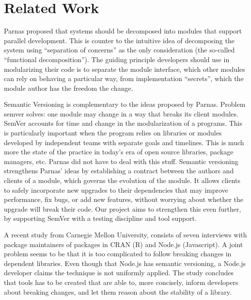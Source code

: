 \section{Related Work}

Parnas\cite{Parnas} proposed that systems should be decomposed into
modules that support parallel development. This is counter to the
intuitive idea of decomposing the system using ``separation of
concerns'' as the only consideration (the so-called ``functional
decomposition''). The guiding principle developers should use in
modularizing their code is to separate the module interface, which
other modules can rely on behaving a particular way, from
implementation ``secrets'', which the module author has the freedom
the change. 

%
Semantic Versioning\cite{semver} is complementary to the ideas
proposed by Parnas.
%
Problem semver solves: one module may change in a way that breaks its
client modules.
%
SemVer accounts for time and change in the modularization of a
programs. This is particularly important when the program relies on
libraries or modules developed by independent teams with separate
goals and timelines. This is much more the state of the practice in
today's era of open source libraries, package managers, etc. Parnas
did not have to deal with this stuff.
%
Semantic versioning strengthens Parnas' ideas by establishing a
contract between the authors and clients of a module, which governs
the evolution of the module. 
%
It allows clients to safely incorporate new upgrades to their
dependencies that may improve performance, fix bugs, or add new
features, without worrying about whether the upgrade will break their
code.
%
Our project aims to strengthen this even further, by supporting SemVer
with a testing discipline and tool support.


A recent study from Carnegie Mellon University\cite{bogart15-break}, consists of seven interviews
with package maintainers of packages in CRAN (R) and Node.js (Javascript). A
joint problem seems to be that it is too complicated to follow breaking changes
in dependent libraries. Even though that Node.js has semantic versioning, a
Node.js developer claims the technique is not uniformly applied. The study
concludes that tools has to be created that are able to, more concisely, inform
developers about breaking changes, and let them reason about the stability of a
library.

